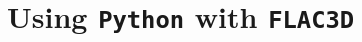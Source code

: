 \documentclass[a4paper, nobind]{templates/ociamthesis}
\begin{document}
\begin{romanpages}

\maketitle




%	


\flushbottom




\end{romanpages}

\flushbottom

\minitoc

\hypertarget{using-python-with-flac3d}{%
\chapter{\texorpdfstring{Using \texttt{Python} with \texttt{FLAC3D}}{Using Python with FLAC3D}}\label{using-python-with-flac3d}}
\end{document}
